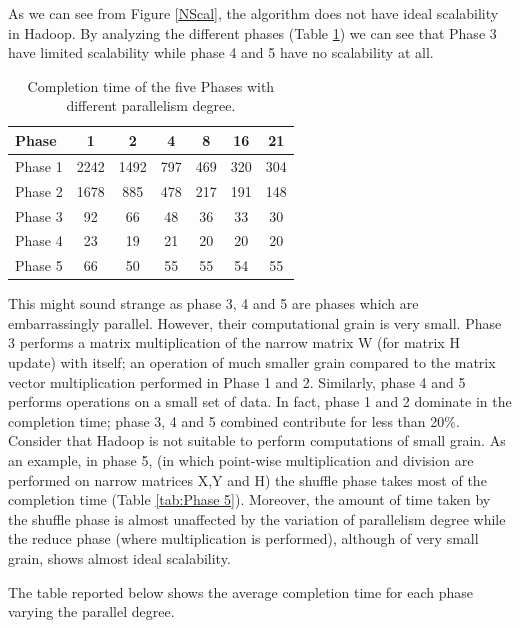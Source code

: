 As we can see from Figure \ref{NScal}, the algorithm does not have ideal scalability in Hadoop.
By analyzing the different phases (Table \ref{tab:differentPhases}) we can see that Phase 3 have limited scalability while phase 4 and 5 have no scalability at all.
\begin{table}[h!]
\begin{center}
\begin{tabular}{ | l || c | c | c | c |  c | c | }

  \hline      
  Phase & 1 & 2 & 4 & 8 &16 & 21 \\
  \hline      
  Phase 1 & 2242 	& 1492 & 797 	& 469 	& 320 	& 304\\
  Phase 2 & 1678 	& 885 	& 478	& 217 	& 191 	& 148\\
  Phase 3 & 92 		& 66 	& 48 	& 36 	& 33 	& 30\\ 
  Phase 4 & 23 		& 19 	& 21 	& 20 	& 20 	& 20\\
  Phase 5 & 66 		& 50 	& 55 	& 55 	& 54 	& 55\\
  \hline  


\end{tabular} 
  \end{center}
  \caption{Completion time of the five Phases with different parallelism degree.}
    \label{tab:differentPhases}
\end{table}
This might sound strange as phase 3, 4 and 5 are phases which are embarrassingly parallel.
However, their computational grain is very small.
Phase 3 performs a matrix multiplication of the narrow matrix W (for matrix H update) with itself; an operation of much smaller grain compared to the matrix vector multiplication performed in Phase 1 and 2. 
Similarly, phase 4 and 5 performs operations on a small set of data.
In fact, phase 1 and 2 dominate in the completion time; phase 3, 4 and 5 combined contribute for less than 20\%.
Consider that Hadoop is not suitable to perform computations of small grain.
As an example, in phase 5, (in which point-wise multiplication and division are performed on narrow matrices X,Y and H)  the shuffle phase takes most of the completion time (Table \ref{tab:Phase 5}). 
Moreover, the amount of time taken by the shuffle phase is almost unaffected by the variation of parallelism degree while the reduce phase (where multiplication is performed), although of very small grain, shows almost ideal scalability.
 
The table reported below shows the average completion time for each phase varying the parallel degree.




